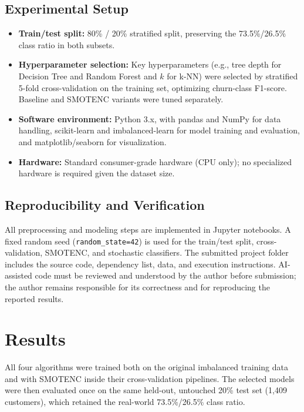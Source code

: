 \documentclass[conference]{IEEEtran}
\begin{document}
	\subsection{Experimental Setup}
	\begin{itemize}
		\item \textbf{Train/test split:} 80\% / 20\% stratified split, preserving the 73.5\%/26.5\% class ratio in both subsets.
		\item \textbf{Hyperparameter selection:} Key hyperparameters (e.g., tree depth for Decision Tree and Random Forest and $k$ for k-NN) were selected by stratified 5-fold cross-validation on the training set, optimizing churn-class F1-score. Baseline and SMOTENC variants were tuned separately.
		\item \textbf{Software environment:} Python 3.x, with pandas and NumPy for data handling, scikit-learn and imbalanced-learn for model training and evaluation, and matplotlib/seaborn for visualization.
		\item \textbf{Hardware:} Standard consumer-grade hardware (CPU only); no specialized hardware is required given the dataset size.
	\end{itemize}
	
	\subsection{Reproducibility and Verification}
	All preprocessing and modeling steps are implemented in Jupyter notebooks. A fixed random seed (\texttt{random\_state=42}) is used for the train/test split, cross-validation, SMOTENC, and stochastic classifiers. The submitted project folder includes the source code, dependency list, data, and execution instructions. AI-assisted code must be reviewed and understood by the author before submission; the author remains responsible for its correctness and for reproducing the reported results.
	
	\section{Results}
	\label{sec:results}
	
	All four algorithms were trained both on the original imbalanced training data and with SMOTENC inside their cross-validation pipelines. The selected models were then evaluated once on the same held-out, untouched 20\% test set (1{,}409 customers), which retained the real-world 73.5\%/26.5\% class ratio.
	
\end{document}

